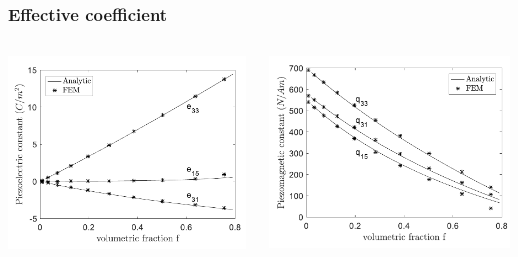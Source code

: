 \documentclass[compress]{beamer}
\begin{document}
\begin{frame}\frametitle{Effective coefficient}
\begin{columns}[totalwidth=\textwidth]
   \begin{column}{.40\textwidth}
   \centering
   \includegraphics[width=0.99\textwidth]{Graphic/04_cylinmatee.pdf}
   \end{column}
   \begin{column}{.40\textwidth}
   \centering
   \includegraphics[width=0.99\textwidth]{Graphic/04_cylinmatqu.pdf}
   \end{column}

\end{columns}
\end{frame}
\end{document}

